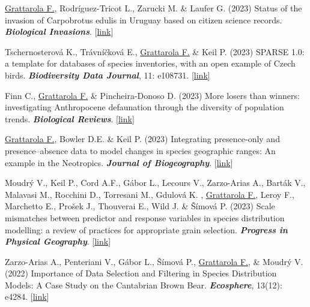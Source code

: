 \documentclass[9pt]{developercv} %
\begin{document}


\begin{etaremune}

\item \underline{Grattarola F.}, Rodríguez-Tricot L., Zarucki M. \& Laufer G. (2023) Status of the invasion of Carpobrotus edulis in Uruguay based on citizen science records. \textit{\textbf{Biological Invasions}}. [\href{https://doi.org/10.1007/s10530-023-03242-w}{link}]

\item Tschernosterová K., Trávníčková E., \underline{Grattarola F.} \& Keil P. (2023) SPARSE 1.0: a template for databases of species inventories, with an open example of Czech birds. \textit{\textbf{Biodiversity Data Journal}}, 11: e108731. [\href{https://doi.org/10.3897/BDJ.11.e108731}{link}]

\item Finn C., \underline{Grattarola F.}  \& Pincheira-Donoso D. (2023) More losers than winners: investigating Anthropocene defaunation through the diversity of population trends. \textit{\textbf{Biological Reviews}}. [\href{https://doi.org/10.1111/brv.12974}{link}]

\item \underline{Grattarola F.}, Bowler D.E. \& Keil P. (2023) Integrating presence-only and presence–absence data to model changes in species geographic ranges: An example in the Neotropics. \textit{\textbf{Journal of Biogeography}}. [\href{https://doi.org/10.1111/jbi.14622}{link}]

\item Moudrý V., Keil P., Cord A.F., Gábor L., Lecours V., Zarzo-Arias A., Barták V.,  Malavasi M., Rocchini D., Torresani M., Gdulová K. , \underline{Grattarola F.}, Leroy F., Marchetto E., Prošek J., Thouverai E., Wild J.  \& Šímová P. (2023) Scale mismatches between predictor and response variables in species distribution modelling: a review of practices for appropriate grain selection. \textit{\textbf{Progress in Physical Geography}}. [\href{https://doi.org/10.1177/03091333231156362}{link}]

\item Zarzo-Arias A., Penteriani V.,  Gábor L., Šímová P.,  \underline{Grattarola F.}, \& Moudrý V. (2022) Importance of Data Selection and Filtering in Species Distribution Models: A Case Study on the Cantabrian Brown Bear. \textit{\textbf{Ecosphere}}, 13(12): e4284. [\href{https://doi.org/10.1002/ecs2.4284}{link}]


\end{etaremune}
\end{document}
